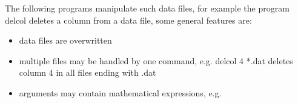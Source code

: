 The following programs manipulate such data files, for example
the program {\prg delcol} deletes a column from a data file,
some general features are:
\begin{itemize}
\item data files are overwritten 
\item multiple files may be handled by one command, e.g. {\prg delcol 4 *.dat} deletes column 4
in all 
files ending with .dat
\item arguments may contain mathematical expressions, e.g. 
\end{itemize}

